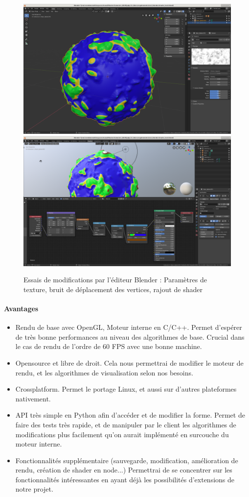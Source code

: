\documentclass[a4paper]{article}
\begin{document}
\begin{figure}[!h]
\includegraphics[width=0.49\linewidth]{img/blender_editeur_bruit.png}
\includegraphics[width=0.48\linewidth]{img/blender_shaderEditor.png}
\caption{Essais de modifications par l'éditeur Blender : Paramètres de texture, bruit de déplacement des vertices, rajout de shader}
\end{figure}

\paragraph{Avantages}

\begin{itemize}
            \item {Rendu de base avec OpenGL, Moteur interne en C/C++.}
            Permet d'espérer de très bonne performances au niveau des algorithmes de base. Crucial dans le cas de rendu de l'ordre de 60 FPS avec une bonne machine.
            \item {Opensource et libre de droit.}
            Cela nous permettrai de modifier le moteur de rendu, et les algorithmes de visualisation selon nos besoins.
            \item {Crossplatform.}
            Permet le portage Linux, et aussi sur d'autres plateformes nativement.
            \item {API très simple en Python afin d'accéder et de modifier la forme.}
            Permet de faire des tests très rapide, et de manipuler par le client les algorithmes de modifications plus facilement qu'on aurait implémenté en surcouche du moteur interne.
            \item {Fonctionnalités supplémentaire (sauvegarde, modification, amélioration de rendu, création de shader en node...)}
            Permettrai de se concentrer sur les fonctionnalités intéressantes en ayant déjà les possibilités d'extensions de notre projet.
\end{itemize}
\end{document}
